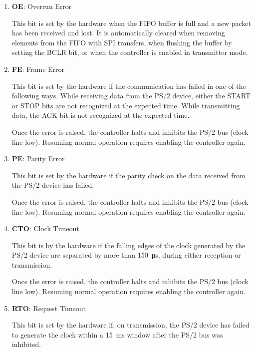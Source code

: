 \begin{description}[style=nextline]
\begin{enumerate}[
            label=\emph{Bit \arabic*}, widest=s 15:8,
            left=\parindent, align=left,
            itemsep=2.5\itemsep,
            start=0
        ]
            \item \textbf{OE}: Overrun Error
            
            This bit is set by the hardware when the FIFO buffer is full and a new packet has been received and lost. It is automatically cleared when removing elements from the FIFO with SPI transfers, when flushing the buffer by setting the BCLR bit, or when the controller is enabled in transmitter mode.
            
            \item \textbf{FE}: Frame Error
    
            This bit is set by the hardware if the communication has failed in one of the following ways. While receiving data from the PS/2 device, either the START or STOP bits are not recognized at the expected time. While transmitting data, the ACK bit is not recognized at the expected time.
            
            Once the error is raised, the controller halts and inhibits the PS/2 bus (clock line low). Resuming normal operation requires enabling the controller again.
            
            \item \textbf{PE}: Parity Error
            
            This bit is set by the hardware if the parity check on the data received from the PS/2 device has failed.
            
            Once the error is raised, the controller halts and inhibits the PS/2 bus (clock line low). Resuming normal operation requires enabling the controller again.
            
            \item \textbf{CTO}: Clock Timeout
    
            This bit is by the hardware if the falling edges of the clock generated by the PS/2 device are separated by more than \qty{150}{\micro\s}, during either reception or transmission.
            
            Once the error is raised, the controller halts and inhibits the PS/2 bus (clock line low). Resuming normal operation requires enabling the controller again.
            
            \item \textbf{RTO}: Request Timeout
    
            This bit is set by the hardware if, on transmission, the PS/2 device has failed to generate the clock within a \qty{15}{\milli\s} window after the PS/2 bus was inhibited.
    

\end{enumerate}
\end{description}
